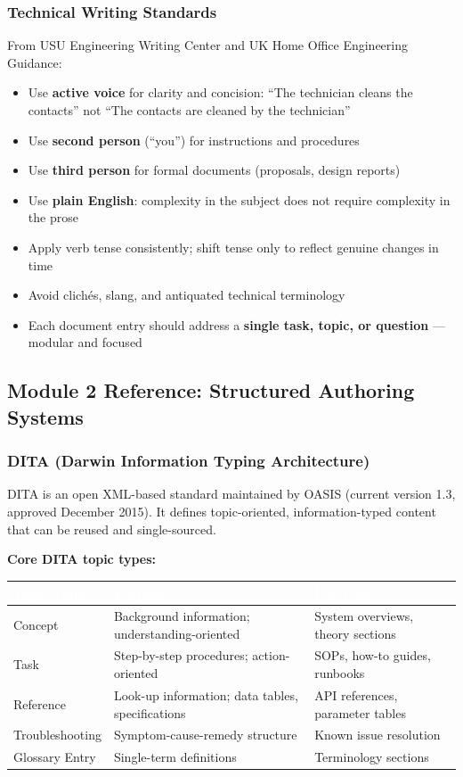 \documentclass[11pt,letterpaper]{article}
\newcommand{\tableheader}[1]{\textbf{\sffamily\textcolor{white}{#1}}}
\begin{document}
\subsubsection{Technical Writing Standards}

From USU Engineering Writing Center and UK Home Office Engineering Guidance:
\begin{itemize}[leftmargin=*]
  \item Use \textbf{active voice} for clarity and concision: ``The technician cleans the contacts'' not ``The contacts are cleaned by the technician''
  \item Use \textbf{second person} (``you'') for instructions and procedures
  \item Use \textbf{third person} for formal documents (proposals, design reports)
  \item Use \textbf{plain English}: complexity in the subject does not require complexity in the prose
  \item Apply verb tense consistently; shift tense only to reflect genuine changes in time
  \item Avoid clichés, slang, and antiquated technical terminology
  \item Each document entry should address a \textbf{single task, topic, or question} --- modular and focused
\end{itemize}

\subsection{Module 2 Reference: Structured Authoring Systems}

\subsubsection{DITA (Darwin Information Typing Architecture)}

DITA is an open XML-based standard maintained by OASIS (current version 1.3, approved December 2015). It defines topic-oriented, information-typed content that can be reused and single-sourced.

\textbf{Core DITA topic types:}
\begin{center}
\begin{tabularx}{\textwidth}{L{3cm}XL{3.5cm}}
\toprule
{}
\tableheader{Topic Type} & \tableheader{Purpose} & \tableheader{Use Case} \\
\midrule
Concept & Background information; understanding-oriented & System overviews, theory sections \\
Task & Step-by-step procedures; action-oriented & SOPs, how-to guides, runbooks \\
Reference & Look-up information; data tables, specifications & API references, parameter tables \\
Troubleshooting & Symptom-cause-remedy structure & Known issue resolution \\
Glossary Entry & Single-term definitions & Terminology sections \\
\bottomrule
\end{tabularx}
\end{center}
\end{document}
